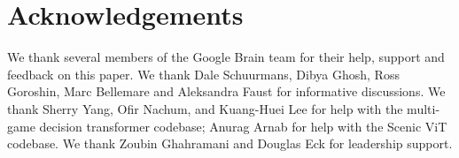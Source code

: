 
\vspace{-0.3cm}
\section*{Acknowledgements}
\vspace{-0.3cm}

We thank several members of the Google Brain team for their help, support and feedback on this paper. We thank Dale Schuurmans, Dibya Ghosh, Ross Goroshin, Marc Bellemare and Aleksandra Faust for informative discussions. We thank Sherry Yang, Ofir Nachum, and Kuang-Huei Lee for help with the multi-game decision transformer codebase; Anurag Arnab for help with the Scenic ViT codebase. We thank Zoubin Ghahramani and Douglas Eck for leadership support.  